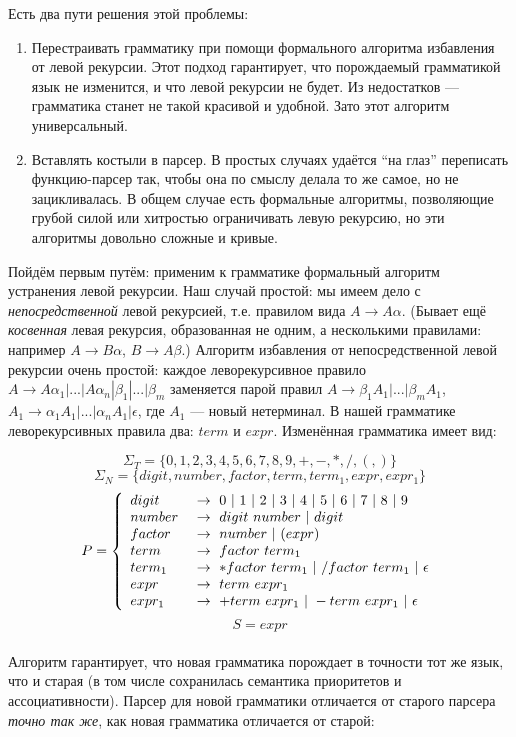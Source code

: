 \documentclass[11pt]{book}
\begin{document}
Есть два пути решения этой проблемы:
    \begin{enumerate}
    \item Перестраивать грамматику при помощи формального алгоритма избавления от левой рекурсии.
    Этот подход гарантирует, что порождаемый грамматикой язык не изменится, и что левой рекурсии
    не будет. Из недостатков --- грамматика станет не такой красивой и удобной. Зато этот алгоритм
    универсальный.
    \item Вставлять костыли в парсер. В простых случаях удаётся ``на глаз'' переписать функцию-парсер так,
    чтобы она по смыслу делала то же самое, но не зацикливалась. В общем случае есть формальные
    алгоритмы, позволяющие грубой силой или хитростью ограничивать левую рекурсию, но эти
    алгоритмы довольно сложные и кривые.
    \end{enumerate}
Пойдём первым путём: применим к грамматике формальный алгоритм устранения левой рекурсии.
Наш случай простой: мы имеем дело с
\emph{непосредственной} левой рекурсией, т.е. правилом вида $A \rightarrow A \alpha$.
(Бывает ещё \emph{косвенная} левая рекурсия, образованная не одним, а несколькими правилами:
например $A \rightarrow B \alpha$, $B \rightarrow A \beta$.) Алгоритм избавления от непосредственной
левой рекурсии очень простой: каждое леворекурсивное правило $A \rightarrow A \alpha_1 | ... | A \alpha_n | \beta_1 | ... | \beta_m$
заменяется парой правил $A \rightarrow \beta_1 A_1 | ... | \beta_m A_1$,
$A_1 \rightarrow \alpha_1 A_1 | ... | \alpha_n A_1 | \epsilon$, где $A_1$ --- новый нетерминал.
В нашей грамматике леворекурсивных правила два: $term$ и $expr$. Изменённая грамматика
имеет вид:

$$\Sigma_T=\{0,1,2,3,4,5,6,7,8,9,+,-,*,/,(,)\}$$
$$\Sigma_N=\{digit, number, factor, term, term_1, expr, expr_1\}$$
$$P=\left\{
\begin{array}{l l}
digit \  & \rightarrow \ 0 \ | \ 1 \ | \ 2 \ | \ 3 \ | \ 4 \ | \ 5 \ | \ 6 \ | \ 7 \ | \ 8 \ | \ 9
\\
number \  & \rightarrow \ digit \ number \ | \ digit
\\
factor \  & \rightarrow \ number \ | \ ( expr )
\\
term \  & \rightarrow \ factor \ term_1
\\
term_1 \  & \rightarrow \ * factor \ term_1 \ | \ / factor \ term_1 \ | \ \epsilon
\\
expr \  & \rightarrow \ term \ expr_1
\\
expr_1 \  & \rightarrow \ + term \ expr_1 \ | \ - term \ expr_1 \ | \ \epsilon
\end{array}
\right. $$
$$S=expr$$
\\
Алгоритм гарантирует, что новая грамматика порождает в точности тот же язык,
что и старая (в том числе сохранилась семантика приоритетов и ассоциативности). Парсер для новой грамматики
отличается от старого парсера \emph{точно так же}, как новая грамматика отличается от старой:
\end{document}
